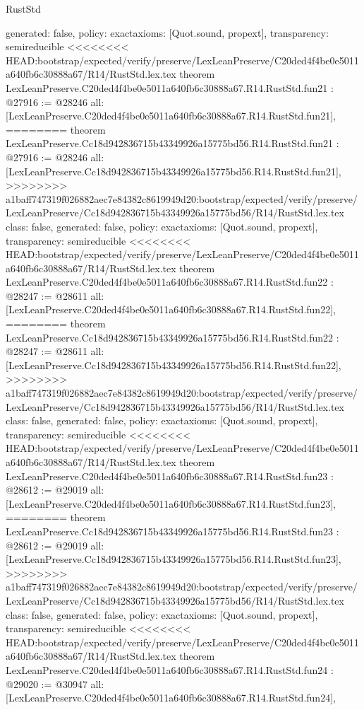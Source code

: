\begin{lexlean}{RustStd}
\begin{coremodule}
{\begin{coremodule}
{{{{{{{{{{{{{{{{{{{{{{{{  generated: false,
  policy: exact{axioms: [Quot.sound, propext]},
  transparency: semireducible
}
<<<<<<<< HEAD:bootstrap/expected/verify/preserve/LexLeanPreserve/C20ded4f4be0e5011a640fb6c30888a67/R14/RustStd.lex.tex
theorem LexLeanPreserve.C20ded4f4be0e5011a640fb6c30888a67.R14.RustStd.fun21 : @27916 := @28246 {
  all: [LexLeanPreserve.C20ded4f4be0e5011a640fb6c30888a67.R14.RustStd.fun21],
========
theorem LexLeanPreserve.Cc18d942836715b43349926a15775bd56.R14.RustStd.fun21 : @27916 := @28246 {
  all: [LexLeanPreserve.Cc18d942836715b43349926a15775bd56.R14.RustStd.fun21],
>>>>>>>> a1baff747319f026882aec7e84382c8619949d20:bootstrap/expected/verify/preserve/LexLeanPreserve/Cc18d942836715b43349926a15775bd56/R14/RustStd.lex.tex
  class: false,
  generated: false,
  policy: exact{axioms: [Quot.sound, propext]},
  transparency: semireducible
}
<<<<<<<< HEAD:bootstrap/expected/verify/preserve/LexLeanPreserve/C20ded4f4be0e5011a640fb6c30888a67/R14/RustStd.lex.tex
theorem LexLeanPreserve.C20ded4f4be0e5011a640fb6c30888a67.R14.RustStd.fun22 : @28247 := @28611 {
  all: [LexLeanPreserve.C20ded4f4be0e5011a640fb6c30888a67.R14.RustStd.fun22],
========
theorem LexLeanPreserve.Cc18d942836715b43349926a15775bd56.R14.RustStd.fun22 : @28247 := @28611 {
  all: [LexLeanPreserve.Cc18d942836715b43349926a15775bd56.R14.RustStd.fun22],
>>>>>>>> a1baff747319f026882aec7e84382c8619949d20:bootstrap/expected/verify/preserve/LexLeanPreserve/Cc18d942836715b43349926a15775bd56/R14/RustStd.lex.tex
  class: false,
  generated: false,
  policy: exact{axioms: [Quot.sound, propext]},
  transparency: semireducible
}
<<<<<<<< HEAD:bootstrap/expected/verify/preserve/LexLeanPreserve/C20ded4f4be0e5011a640fb6c30888a67/R14/RustStd.lex.tex
theorem LexLeanPreserve.C20ded4f4be0e5011a640fb6c30888a67.R14.RustStd.fun23 : @28612 := @29019 {
  all: [LexLeanPreserve.C20ded4f4be0e5011a640fb6c30888a67.R14.RustStd.fun23],
========
theorem LexLeanPreserve.Cc18d942836715b43349926a15775bd56.R14.RustStd.fun23 : @28612 := @29019 {
  all: [LexLeanPreserve.Cc18d942836715b43349926a15775bd56.R14.RustStd.fun23],
>>>>>>>> a1baff747319f026882aec7e84382c8619949d20:bootstrap/expected/verify/preserve/LexLeanPreserve/Cc18d942836715b43349926a15775bd56/R14/RustStd.lex.tex
  class: false,
  generated: false,
  policy: exact{axioms: [Quot.sound, propext]},
  transparency: semireducible
}
<<<<<<<< HEAD:bootstrap/expected/verify/preserve/LexLeanPreserve/C20ded4f4be0e5011a640fb6c30888a67/R14/RustStd.lex.tex
theorem LexLeanPreserve.C20ded4f4be0e5011a640fb6c30888a67.R14.RustStd.fun24 : @29020 := @30947 {
  all: [LexLeanPreserve.C20ded4f4be0e5011a640fb6c30888a67.R14.RustStd.fun24],
}}}}}}}}}}}}}}}}}}}}}}}}}}}
\end{coremodule}}
\end{coremodule}
\end{lexlean}
